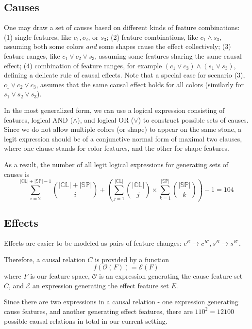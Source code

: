 \documentclass{article}
\newcommand{\featurespace}{F}
\newcommand{\colorspace}{\mathbb{CL}}
\newcommand{\shapespace}{\mathbb{SP}}
\begin{document}
\subsection*{Causes}

One may draw a set of causes based on different kinds of feature combinations:
%
(1) single features, like $c_1, c_2$, or $s_3$;
%
(2) feature combinations, like $c_1 \wedge s_3$, assuming both some colors \emph{and} some shapes cause the effect collectively;
%
(3) feature ranges, like $c_1 \vee c_2 \vee s_3$, assuming some features sharing the same causal effect;
%
(4) combination of feature ranges, for example $(c_1 \vee c_3) \wedge (s_1 \vee s_3)$, defining a delicate rule of causal effects.
%
Note that a special case for scenario (3), $c_1 \vee c_2 \vee c_3$, assumes that the same causal effect holds for all colors (similarly for $s_1 \vee s_2 \vee s_3$).

In the most generalized form, we can use a logical expression consisting of features, logical AND ($\wedge$), and logical OR ($\vee$) to construct possible sets of causes. Since we do not allow multiple colors (or shape) to appear on the same stone, a legit expression should be of a conjunctive normal form of maximal two clauses, where one clause stands for color features, and the other for shape features.

As a result, the number of all legit logical expressions for generating sets of causes is 
%
$$
	\sum_{i = 2}^{|\colorspace| + |\shapespace| -1} \binom{|\colorspace| + |\shapespace| }{i} +
 \left(
 	\sum_{j = 1}^{|\colorspace|} \binom{|\colorspace|}{j} \times
  	\sum_{k = 1}^{|\shapespace|} \binom{|\shapespace|}{k}
 \right)
	- 1
	= 104
$$

\subsection*{Effects}

Effects are easier to be modeled as pairs of feature changes: $c^R \rightarrow c^{R'}, s^R \rightarrow s^{R'}$.





Therefore, a causal relation $C$ is provided by a function 
%
$$f(\mathcal{O}(\featurespace)) = \mathcal{E}(\featurespace)$$
%
where $\featurespace$ is our feature space, $\mathcal{O}$ is an expression generating the cause feature set $C$, and $\mathcal{E}$ an expression generating the effect feature set $E$.


Since there are two expressions in a causal relation - one expression generating cause features, and another generating effect features, there are $110^2 = 12100$ possible causal relations in total in our current setting.
\end{document}
